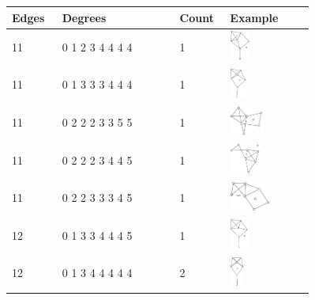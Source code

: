 \begin{table}[h!]
\centering

\begin{tabular}{m{0.15\linewidth} m{0.35\linewidth} m{0.15\linewidth} m{0.25\linewidth}}
 \toprule
    Edges & Degrees & Count & Example\\ [0.5ex]
 \midrule
11 & 0 1 2 3 4 4 4 4 & 1 & \includegraphics[height=1cm]{15-universal-graphs/img/degree-sequences-example-graphs/graph-4-8-0}\\
11 & 0 1 3 3 3 4 4 4 & 1 & \includegraphics[height=1cm]{15-universal-graphs/img/degree-sequences-example-graphs/graph-4-8-1}\\
11 & 0 2 2 2 3 3 5 5 & 1 & \includegraphics[height=1cm]{15-universal-graphs/img/degree-sequences-example-graphs/graph-4-8-2}\\
11 & 0 2 2 2 3 4 4 5 & 1 & \includegraphics[height=1cm]{15-universal-graphs/img/degree-sequences-example-graphs/graph-4-8-3}\\
11 & 0 2 2 3 3 3 4 5 & 1 & \includegraphics[height=1cm]{15-universal-graphs/img/degree-sequences-example-graphs/graph-4-8-4}\\
12 & 0 1 3 3 4 4 4 5 & 1 & \includegraphics[height=1cm]{15-universal-graphs/img/degree-sequences-example-graphs/graph-4-8-5}\\
12 & 0 1 3 4 4 4 4 4 & 2 & \includegraphics[height=1cm]{15-universal-graphs/img/degree-sequences-example-graphs/graph-4-8-6}\\

\end{tabular}
\end{table}
